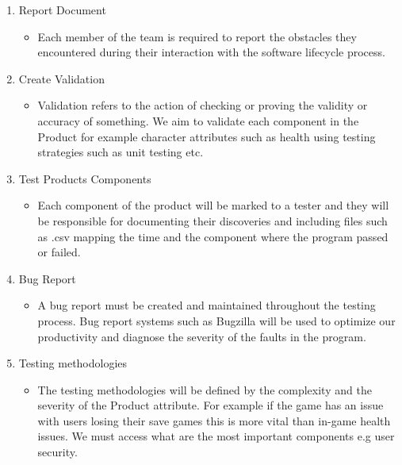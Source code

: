 \begin{enumerate}
   \item Report Document
   \begin{itemize}
     \item  Each member of the team is required to report the obstacles they encountered during their interaction with the software lifecycle process.
   \end{itemize}
  
  \item Create Validation
   \begin{itemize}
     \item Validation refers to the action of checking or proving the validity or accuracy of something. We aim to validate each component in the Product for example character attributes such as health using testing strategies such as unit testing etc.
   \end{itemize}

     \item Test Products Components
   \begin{itemize}
     \item Each component of the product will be marked to a tester and they will be responsible for documenting their discoveries and including files such as .csv mapping the time and the component where the program passed or failed.
   \end{itemize}


   \item  Bug  Report
   \begin{itemize}
     \item A bug report must be created and maintained throughout the testing process. Bug report systems such as Bugzilla will be used to optimize our productivity and diagnose the severity of the faults in the program.
   \end{itemize}

 

  \item Testing methodologies
   \begin{itemize}
     \item The testing methodologies will be defined by the complexity and the severity of the Product attribute. For example if the game has an issue with users losing their save games this is more vital than in-game health issues. We must access what are the most important components e.g user security.
   \end{itemize}
\end{enumerate}
